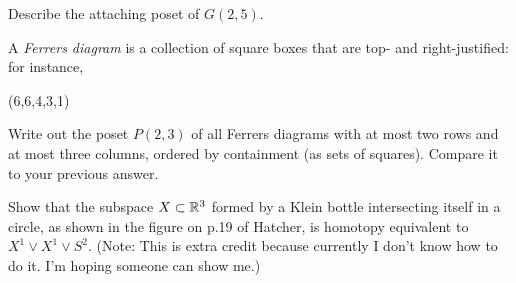 \probpart Describe the attaching poset of $G(2,5)$.

\probpart A \emph{Ferrers diagram} is a collection of square boxes that
are top- and right-justified: for instance,
\begin{center}
\yng(6,6,4,3,1)
\end{center}
Write out the poset $P(2,3)$ of all Ferrers diagrams with at most two 
rows and at most three columns, ordered by containment (as sets of 
squares).  Compare it to your previous answer.

 Show that the subspace $X\subset\mathbb{R}^3$ formed by a Klein bottle intersecting itself in a circle, as shown in the figure on p.19 of Hatcher, is homotopy equivalent to $X^1\vee X^1\vee S^2$.  (Note: This is extra credit because currently I don't know how to do it.  I'm hoping someone can show me.)


